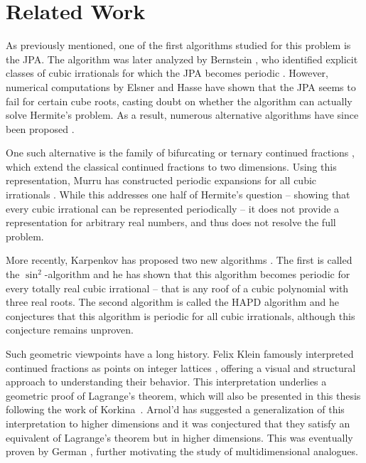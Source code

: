 \section{Related Work}

As previously mentioned,
one of the first algorithms studied for this problem is the JPA.
The algorithm was later analyzed by Bernstein \cite{Bernstein71},
who identified explicit classes of cubic irrationals for which the JPA
becomes periodic \cite{Bernstein64A, Bernstein65, Bernstein64B}.
However, numerical computations by Elsner and Hasse \cite{Elsner67} have shown
that the JPA seems to fail for certain cube roots,
casting doubt on whether the algorithm can actually solve Hermite’s problem.
As a result, numerous alternative algorithms have since been proposed
\cite{Assaf05, Hendy81, Schweiger00, Schweiger13}.

One such alternative is the family of bifurcating or ternary continued
fractions \cite{Gupta00},
which extend the classical continued fractions to two dimensions.
Using this representation, Murru has constructed periodic expansions for all
cubic irrationals \cite{Murru15}.
While this addresses one half of Hermite’s question --
showing that every cubic irrational can be represented periodically --
it does not provide a representation for arbitrary real numbers,
and thus does not resolve the full problem.

More recently, Karpenkov has proposed two new algorithms \cite{Karpenkov21, Karpenkov24}.
The first is called the $\sin^2$-algorithm and he has shown that this algorithm
becomes periodic for every totally real cubic irrational -- that is any roof of
a cubic polynomial with three real roots.
The second algorithm is called the HAPD algorithm \cite{Karpenkov24} and he
conjectures that this algorithm is periodic for all cubic irrationals,
although this conjecture remains unproven.

Such geometric viewpoints have a long history.
Felix Klein famously interpreted continued fractions as points on integer
lattices \cite{Klein95}, offering a visual and structural approach to
understanding their behavior.
This interpretation underlies a geometric proof of Lagrange’s theorem, which
will also be presented in this thesis following the work of
Korkina~\cite{Korkina96}.
Arnol'd has suggested a generalization of this interpretation to higher
dimensions \cite{Arnold98} and it was conjectured that they satisfy an
equivalent of Lagrange's theorem but in higher dimensions.
This was eventually proven by German \cite{German08}, further motivating the
study of multidimensional analogues.

